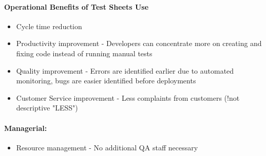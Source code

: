 \paragraph{Operational Benefits of Test Sheets Use}
\begin{itemize}
	\item Cycle time reduction
	\item Productivity improvement - Developers can concentrate more on creating and fixing code instead of running manual tests
	\item Quality improvement - Errors are identified earlier due to automated monitoring, bugs are easier identified before deployments
	\item Customer Service improvement - Less complaints from customers (!not descriptive "LESS")
\end{itemize}

\paragraph{Managerial:}
\begin{itemize}
	\item Resource management - No additional QA staff necessary
\end{itemize}

